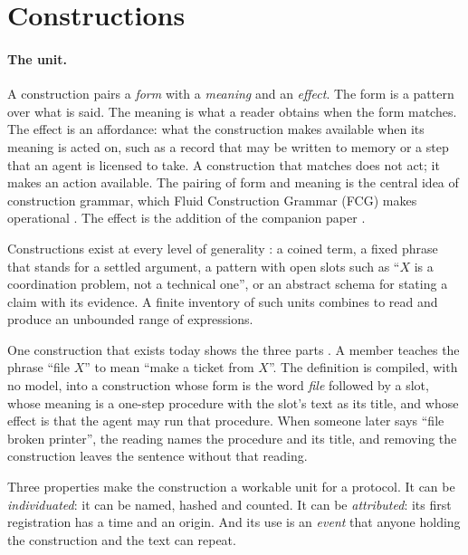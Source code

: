 \section{Constructions}\label{sec:constructions}

\paragraph{The unit.} A construction pairs a \emph{form} with a \emph{meaning} and an \emph{effect}. The form is a
pattern over what is said. The meaning is what a reader obtains when the form matches. The effect is an affordance:
what the construction makes available when its meaning is acted on, such as a record that may be written to memory
or a step that an agent is licensed to take. A construction that matches does not act; it makes an action
available. The pairing of form and meaning is the central idea of construction grammar, which Fluid Construction
Grammar (FCG) makes operational \citep{beuls2023fcgstate}. The effect is the addition of the companion paper
\citep{vera2026constructions}.

Constructions exist at every level of generality \citep{beuls2023cxgai}: a coined term, a fixed phrase that stands
for a settled argument, a pattern with open slots such as ``$X$ is a coordination problem, not a technical one'',
or an abstract schema for stating a claim with its evidence. A finite inventory of such units combines to read and
produce an unbounded range of expressions.

One construction that exists today shows the three parts \citep{vera2026constructions}. A member teaches the phrase
``file $X$'' to mean ``make a ticket from $X$''. The definition is compiled, with no model, into a construction
whose form is the word \emph{file} followed by a slot, whose meaning is a one-step procedure with the slot's text
as its title, and whose effect is that the agent may run that procedure. When someone later says ``file broken
printer'', the reading names the procedure and its title, and removing the construction leaves the sentence without
that reading.

Three properties make the construction a workable unit for a protocol. It can be \emph{individuated}: it can be
named, hashed and counted. It can be \emph{attributed}: its first registration has a time and an origin. And its use
is an \emph{event} that anyone holding the construction and the text can repeat.

